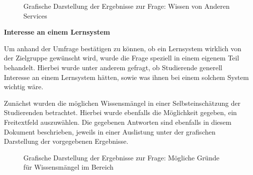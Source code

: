 \documentclass[
	ngerman,
	BCOR=8mm,
	headings=normal,
	parskip=half,
	headsepline,
	automark,
	listof=totoc,
	bibliography=totoc,
]{scrreprt}
\begin{document}
\begin{figure}[h!]
    \centering
    
    \caption{Grafische Darstellung der Ergebnisse zur Frage: Wissen von Anderen Services}
\end{figure}

\newpage
{\LARGE \textbf{Interesse an einem Lernsystem}}

Um anhand der Umfrage bestätigen zu können, ob ein Lernsystem wirklich von der Zielgruppe gewünscht wird, wurde die Frage speziell in einem eigenem Teil behandelt.
Hierbei wurde unter anderem gefragt, ob Studierende generell Interesse an einem Lernsystem hätten, sowie was ihnen bei einem solchem System wichtig wäre.

Zunächst wurden die möglichen Wissensmängel in einer Selbsteinschätzung der Studierenden betrachtet. Hierbei wurde ebenfalls die Möglichkeit gegeben, ein Freitextfeld auszuwählen. 
Die gegebenen Antworten sind ebenfalls in diesem Dokument beschrieben, jeweils in einer Auslistung unter der grafischen Darstellung der vorgegebenen Ergebnisse.

\begin{figure}[h!]
    \centering
    
    \caption{Grafische Darstellung der Ergebnisse zur Frage: Mögliche Gründe für Wissensmängel im Bereich}
\end{figure}
\end{document}

